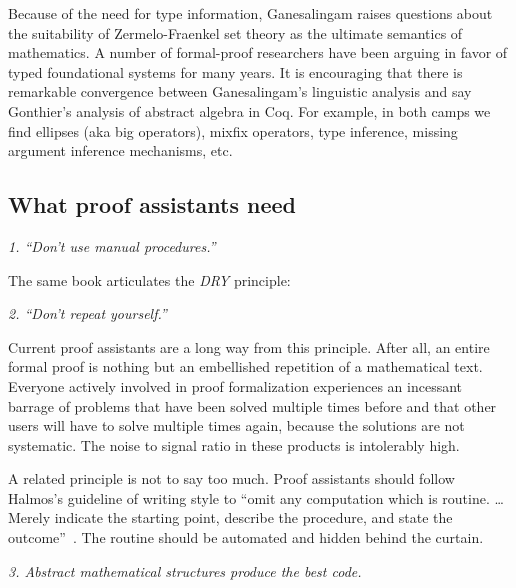 \documentclass{llncs}
\newcommand{\ring}[1]{\mathbb{#1}}
\begin{document}
Because of the need for type information, Ganesalingam raises
questions about the suitability of Zermelo-Fraenkel set theory as the
ultimate semantics of mathematics.  A number of formal-proof
researchers have been arguing in favor of typed foundational systems
for many years.  It is encouraging that there is  remarkable
convergence between Ganesalingam's linguistic analysis and say
Gonthier's analysis of abstract algebra in Coq. For example, in both
camps we find ellipses (aka big operators), mixfix operators, type
inference, missing argument inference mechanisms, etc.





\subsection{What proof assistants need}


\def\princ#1{\smallskip\hfill\break\smallskip\centerline{\it #1\hfill}}

\princ{1. ``Don't use manual procedures.''~\cite{XX}}

  The same book articulates the {\it DRY} principle:
\princ{2. ``Don't repeat yourself.''}

Current proof assistants are a long way from this principle.  After
all, an entire formal proof is nothing but an embellished repetition
of a mathematical text.  Everyone actively involved in proof
formalization experiences an incessant barrage of problems that have
been solved multiple times before and that other users will have to
solve multiple times again, because the solutions are not systematic.
The noise to signal ratio in these products is intolerably high.


A related principle is not to say too much.  
Proof assistants should follow Halmos's guideline of writing style to ``omit
any computation which is routine. \dots Merely indicate the starting point,
describe the procedure, and state the outcome''~\cite{Halmos}.  The routine
should be automated and hidden behind the curtain.

\princ{3. Abstract mathematical 
structures produce the best code.~\cite{XX}} %
\end{document}
